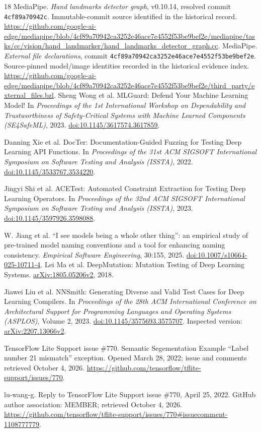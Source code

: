 \documentclass[10pt,conference]{IEEEtran}
\newcommand{\code}[1]{\texttt{#1}}
\begin{document}
\begin{thebibliography}{18}
 MediaPipe. \emph{Hand landmarks detector graph}, v0.10.14, resolved commit \code{4cf89a70942c}. Immutable-commit source identified in the historical record. \url{https://github.com/google-ai-edge/mediapipe/blob/4cf89a70942ca3252e46ace7e4552f53be9bef2e/mediapipe/tasks/cc/vision/hand_landmarker/hand_landmarks_detector_graph.cc}.
 MediaPipe. \emph{External file declarations}, commit \code{4cf89a70942ca3252e46ace7e4552f53be9bef2e}. Source-pinned model/image identities recorded in the historical evidence index. \url{https://github.com/google-ai-edge/mediapipe/blob/4cf89a70942ca3252e46ace7e4552f53be9bef2e/third_party/external_files.bzl}.
 Sheng Wong et al. MLGuard: Defend Your Machine Learning Model! In \emph{Proceedings of the 1st International Workshop on Dependability and Trustworthiness of Safety-Critical Systems with Machine Learned Components (SE4SafeML)}, 2023. \href{https://doi.org/10.1145/3617574.3617859}{doi:10.1145/3617574.3617859}.

 Danning Xie et al. DocTer: Documentation-Guided Fuzzing for Testing Deep Learning API Functions. In \emph{Proceedings of the 31st ACM SIGSOFT International Symposium on Software Testing and Analysis (ISSTA)}, 2022. \href{https://doi.org/10.1145/3533767.3534220}{doi:10.1145/3533767.3534220}.

 Jingyi Shi et al. ACETest: Automated Constraint Extraction for Testing Deep Learning Operators. In \emph{Proceedings of the 32nd ACM SIGSOFT International Symposium on Software Testing and Analysis (ISSTA)}, 2023. \href{https://doi.org/10.1145/3597926.3598088}{doi:10.1145/3597926.3598088}.

 W. Jiang et al. ``I see models being a whole other thing'': an empirical study of pre-trained model naming conventions and a tool for enhancing naming consistency. \emph{Empirical Software Engineering}, 30:155, 2025. \href{https://doi.org/10.1007/s10664-025-10711-4}{doi:10.1007/s10664-025-10711-4}.
 Lei Ma et al.
DeepMutation: Mutation Testing of Deep Learning Systems.
\href{https://arxiv.org/abs/1805.05206v2}{arXiv:1805.05206v2}, 2018.

 Jiawei Liu et al.
NNSmith: Generating Diverse and Valid Test Cases for Deep Learning Compilers.
In \emph{Proceedings of the 28th ACM International Conference on Architectural
Support for Programming Languages and Operating Systems (ASPLOS)}, Volume 2,
2023.
\href{https://doi.org/10.1145/3575693.3575707}{doi:10.1145/3575693.3575707}.
Inspected version: \href{https://arxiv.org/abs/2207.13066v2}{arXiv:2207.13066v2}.

 TensorFlow Lite Support issue \#770.
Semantic Segementation Example ``Label number 21 mismatch'' exception.
Opened March 28, 2022; issue and comments retrieved October 4, 2026.
\url{https://github.com/tensorflow/tflite-support/issues/770}.

 lu-wang-g.
Reply to TensorFlow Lite Support issue \#770, April 25, 2022.
GitHub author association: MEMBER; retrieved October 4, 2026.
\url{https://github.com/tensorflow/tflite-support/issues/770#issuecomment-1108777779}.
\end{thebibliography}
\end{document}
